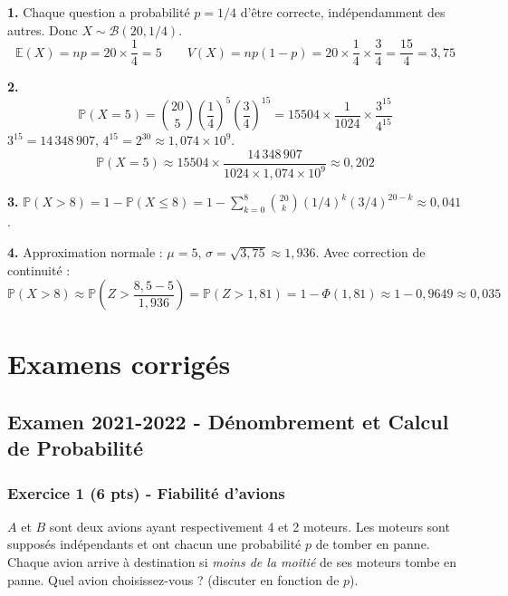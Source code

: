 \documentclass[12pt,a4paper]{article}
\begin{document}
\begin{boitecorrige}
\textbf{1.} Chaque question a probabilité $p = 1/4$ d'être correcte, indépendamment des autres. Donc $X \sim \mathcal{B}(20, 1/4)$.
\[
\mathbb{E}(X) = np = 20\times\frac{1}{4} = 5 \qquad V(X) = np(1-p) = 20\times\frac{1}{4}\times\frac{3}{4} = \frac{15}{4} = 3{,}75
\]

\textbf{2.}
\[
\mathbb{P}(X=5) = \binom{20}{5}\!\left(\frac{1}{4}\right)^5\!\left(\frac{3}{4}\right)^{15} = 15504\times\frac{1}{1024}\times\frac{3^{15}}{4^{15}}
\]
$3^{15} = 14\,348\,907$, $4^{15} = 2^{30} \approx 1{,}074\times10^9$.
\[
\mathbb{P}(X=5) \approx 15504\times\frac{14\,348\,907}{1024\times1{,}074\times10^9} \approx \boxed{0{,}202}
\]

\textbf{3.} $\mathbb{P}(X>8) = 1-\mathbb{P}(X\leq8) = 1-\sum_{k=0}^8\binom{20}{k}(1/4)^k(3/4)^{20-k} \approx \boxed{0{,}041}$.

\textbf{4.} Approximation normale : $\mu=5$, $\sigma=\sqrt{3{,}75}\approx1{,}936$. Avec correction de continuité :
\[
\mathbb{P}(X>8) \approx \mathbb{P}\!\left(Z > \frac{8{,}5-5}{1{,}936}\right) = \mathbb{P}(Z > 1{,}81) = 1-\Phi(1{,}81) \approx 1-0{,}9649 \approx \boxed{0{,}035}
\]
\end{boitecorrige}


\section{Examens corrigés}

\subsection*{Examen 2021-2022 - Dénombrement et Calcul de Probabilité}

\subsubsection*{Exercice 1 (6 pts) - Fiabilité d'avions \niveau{\moyen}}

\begin{boiteexercice}
$A$ et $B$ sont deux avions ayant respectivement 4 et 2 moteurs. Les moteurs sont supposés indépendants et ont chacun une probabilité $p$ de tomber en panne. Chaque avion arrive à destination si \textit{moins de la moitié} de ses moteurs tombe en panne. Quel avion choisissez-vous ? (discuter en fonction de $p$).
\end{boiteexercice}
\end{document}
